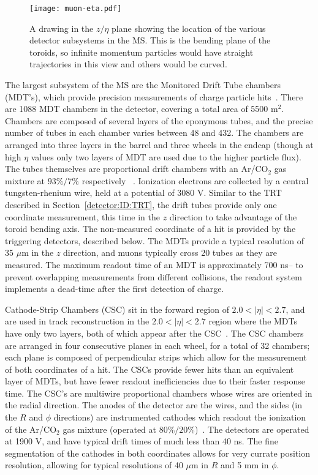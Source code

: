 \begin{figure}
\centering
\texttt{[image: muon-eta.pdf]}
\label{fig:detector:ms-eta}
\caption{A drawing in the $z/\eta$ plane showing the location of the various detector subsystems in the MS. This is the bending plane of the toroids, so infinite momentum particles would have straight trajectories in this view and others would be curved.}
\end{figure}


The largest subsystem of the MS are the Monitored Drift Tube chambers (MDT's), which provide precision measurements of charge particle hits~\cite{ATLASPaper}. There are 1088 MDT chambers in the detector, covering a total area of 5500 m$^2$. Chambers are composed of several layers of the eponymous tubes, and the precise number of tubes in each chamber varies between 48 and 432. The chambers are arranged into three layers in the barrel and three wheels in the endcap (though at high $\eta$ values only two layers of MDT are used due to the higher particle flux). The tubes themselves are proportional drift chambers with an Ar/CO$_2$ gas mixture at $93\%/7\%$ respectively ~\cite{ATLASPaper,Detectors}. Ionization electrons are collected by a central tungsten-rhenium wire, held at a potential of 3080 V. Similar to the TRT described in Section~\ref{detector:ID:TRT}, the drift tubes provide only one coordinate measurement, this time in the $z$ direction to take advantage of the toroid bending axis. The non-measured coordinate of a hit is provided by the triggering detectors, described below. The MDTs provide a typical resolution of 35 $\mu$m in the $z$ direction, and muons typically cross 20 tubes as they are measured. The maximum readout time of an MDT is approximately 700 ns-- to prevent overlapping measurements from different collisions, the readout system implements a dead-time after the first detection of charge.
 
Cathode-Strip Chambers (CSC) sit in the forward region of $2.0 < |\eta| < 2.7$, and are used in track reconstruction in the $2.0 < |\eta| < 2.7$ region where the MDTs have only two layers, both of which appear after the CSC~\cite{ATLASPaper}. The CSC chambers are arranged in four consecutive planes in each wheel, for a total of 32 chambers; each plane is composed of perpendicular strips which allow for the measurement of both coordinates of a hit. The CSCs provide fewer hits than an equivalent layer of MDTs, but have fewer readout inefficiencies due to their faster response time. The CSC's are multiwire proportional chambers whose wires are oriented in the radial direction. The anodes of the detector are the wires, and the sides (in the $R$ and $\phi$ directions) are instrumented cathodes which readout the ionization of the Ar/CO$_2$ gas mixture (operated at $80\%/20\%$)~\cite{Detectors,ATLASPaper}. The detectors are operated at 1900 V, and have typical drift times of much less than 40 ns. The fine segmentation of the cathodes in both coordinates allows for very currate position resolution, allowing for typical resolutions of 40 $\mu$m in $R$ and 5 mm in $\phi$.

